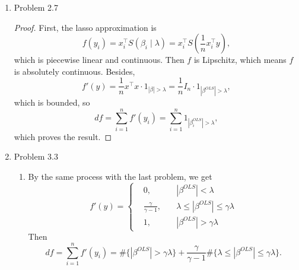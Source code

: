\documentclass{article}
\begin{document}
\begin{enumerate}
\begin{proof}
First, when $|x| \le \lambda$, SCAD penalty is just the $\lVert\cdot\rVert_1 $ penalty for lasso, so the thresholding operator is the same with lasso. When $|x| \ge \gamma\lambda$, the penalty is a constant, so the operator does not change the value. Now consider the case when $2\lambda < z < \gamma\lambda$; the other part when $z < 0$ is just the same. The subgradient of $Q$ in the univariate problem is
$$
\partial Q = -z +\beta + \frac{\gamma\lambda - \partial(|\beta|)}{\gamma - 1}.
$$
If $\beta \ne 0$, then let $\partial Q = 0$, we have 
$$
\beta = \frac{\gamma-1}{\gamma-2}(z-\frac{\lambda\gamma}{\gamma-1}).
$$
If $\beta = 0$, then $\partial(|\beta|)= [-1, 1] $, and by $0\in\partial Q$ we have
$$
|z| \le \frac{\gamma\lambda}{\gamma-1}.
$$
So
$$
\beta = \left\{
\begin{aligned}
\frac{\gamma-1}{\gamma-2}(z-\frac{\lambda\gamma}{\gamma-1}), & \quad |z| > \frac{\gamma\lambda}{\gamma-1}, \\
0, & \quad \text{otherwise}.
\end{aligned}
\right.
$$
Notice $\gamma > 2$, we have $\frac{\gamma}{\gamma-1} < 2$. By combining the second case with the lasso operator, we can show the result.
\end{proof}

\item Problem 2.7
\begin{proof}
First, the lasso approximation is 
$$
f(y_i) = x_i^\top S(\beta_i\mid \lambda) = x_i^\top S(\frac{1}{n}x_i^\top y),
$$
which is piecewise linear and continuous. Then $f$ is Lipschitz, which means $f$ is absolutely continuous. Besides,
$$
f'(y) = \frac{1}{n}x^\top x \cdot 1_{|\beta| > \lambda} = \frac{1}{n} I_n\cdot 1_{|\beta^{OLS}| > \lambda}, 
$$
which is bounded, so
$$
df = \sum_{i=1}^{n} f'(y_i) = \sum_{i=1}^{n} 1_{|\beta^{OLS}_i| > \lambda},
$$
which proves the result.

\end{proof}

\item Problem 3.3

\begin{enumerate}
\item 
By the same process with the last problem, we get
$$
f'(y) = \left\{
\begin{aligned}
&0, &\quad  |\beta^{OLS}| < \lambda \\
&\frac{\gamma}{\gamma-1}, &\quad  \lambda \le |\beta^{OLS}| \le \gamma\lambda \\
&1, &\quad  |\beta^{OLS}| > \gamma\lambda
\end{aligned}
\right.
$$
Then
$$
df = \sum_{i=1}^{n}f'(y_i) = \#\{|\beta^{OLS}| > \gamma\lambda\} +\frac{\gamma}{\gamma-1} \#\{\lambda \le |\beta^{OLS}| \le \gamma\lambda\}.
$$


\end{enumerate}
\end{enumerate}
\end{document}
